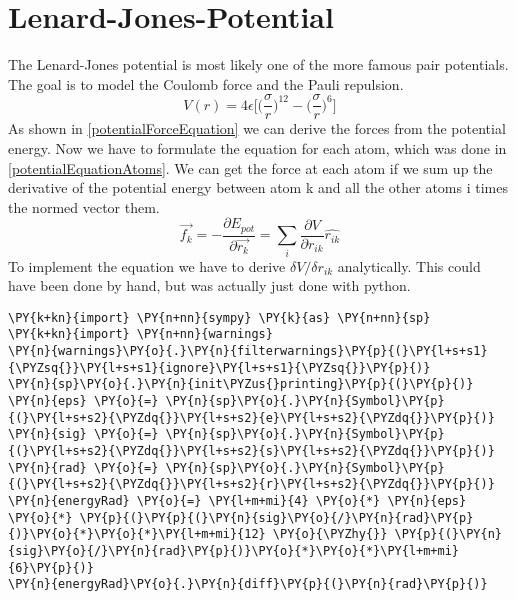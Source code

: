 \section{Lenard-Jones-Potential}
\begin{comment}
- pair potential
\end{comment}
The Lenard-Jones potential is most likely one of the more famous pair potentials. The goal is to model the Coulomb force and the Pauli repulsion. 
\begin{equation}
	V(r) = 4\epsilon\bigg[\Big(\frac{\sigma}{r}\Big)^{12}- \Big(\frac{\sigma}{r}\Big)^{6} \bigg]
\end{equation}
As shown in \ref{potentialForceEquation} we can derive the forces from the potential energy. Now we have to formulate the equation for each atom, which was done in \ref {potentialEquationAtoms}. We can get the force at each atom if we sum up the derivative of the potential energy between atom k and all the other atoms i times the normed vector them. 
\begin{equation}
	\label{potentialEquationAtoms}
	\overrightarrow{f_{k}} = -\frac{\partial E_{pot}}{\partial  \overrightarrow{r_{k}}}=\sum_{i}^{}\frac{\partial V}{\partial r_{ik}} \hat{r_{ik}}
\end{equation}
To implement the equation we have to derive $\delta V/ \delta r_{ik}$ analytically. This could have been done by hand, but was actually just done with python. 
\begin{tcolorbox}[breakable, size=fbox, boxrule=1pt, pad at break*=1mm,colback=cellbackground, colframe=cellborder]
\begin{Verbatim}[commandchars=\\\{\}]
\PY{k+kn}{import} \PY{n+nn}{sympy} \PY{k}{as} \PY{n+nn}{sp}
\PY{k+kn}{import} \PY{n+nn}{warnings}
\PY{n}{warnings}\PY{o}{.}\PY{n}{filterwarnings}\PY{p}{(}\PY{l+s+s1}{\PYZsq{}}\PY{l+s+s1}{ignore}\PY{l+s+s1}{\PYZsq{}}\PY{p}{)}
\PY{n}{sp}\PY{o}{.}\PY{n}{init\PYZus{}printing}\PY{p}{(}\PY{p}{)}
\PY{n}{eps} \PY{o}{=} \PY{n}{sp}\PY{o}{.}\PY{n}{Symbol}\PY{p}{(}\PY{l+s+s2}{\PYZdq{}}\PY{l+s+s2}{e}\PY{l+s+s2}{\PYZdq{}}\PY{p}{)}
\PY{n}{sig} \PY{o}{=} \PY{n}{sp}\PY{o}{.}\PY{n}{Symbol}\PY{p}{(}\PY{l+s+s2}{\PYZdq{}}\PY{l+s+s2}{s}\PY{l+s+s2}{\PYZdq{}}\PY{p}{)}
\PY{n}{rad} \PY{o}{=} \PY{n}{sp}\PY{o}{.}\PY{n}{Symbol}\PY{p}{(}\PY{l+s+s2}{\PYZdq{}}\PY{l+s+s2}{r}\PY{l+s+s2}{\PYZdq{}}\PY{p}{)}
\PY{n}{energyRad} \PY{o}{=} \PY{l+m+mi}{4} \PY{o}{*} \PY{n}{eps} \PY{o}{*} \PY{p}{(}\PY{p}{(}\PY{n}{sig}\PY{o}{/}\PY{n}{rad}\PY{p}{)}\PY{o}{*}\PY{o}{*}\PY{l+m+mi}{12} \PY{o}{\PYZhy{}} \PY{p}{(}\PY{n}{sig}\PY{o}{/}\PY{n}{rad}\PY{p}{)}\PY{o}{*}\PY{o}{*}\PY{l+m+mi}{6}\PY{p}{)}
\PY{n}{energyRad}\PY{o}{.}\PY{n}{diff}\PY{p}{(}\PY{n}{rad}\PY{p}{)}
	\end{Verbatim}
\end{tcolorbox}

